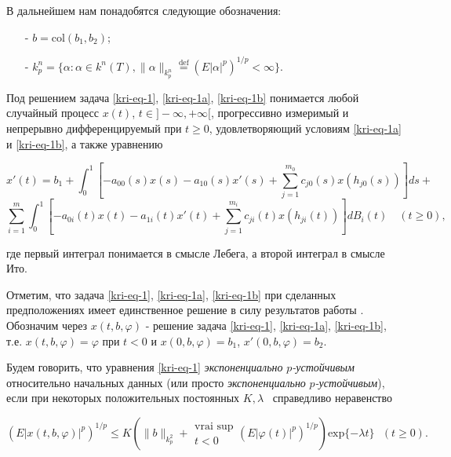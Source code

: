 В дальнейшем нам понадобятся следующие обозначения:

\begin{itemize}
	\item[-]
	$b=\text{col}(b_1,b_2)$;
	
	\item[-]
	$k_p^n=\{\alpha :\alpha \in k^n(T),\|\alpha \|_{k_p^n}\overset{\text{def}}{=}\left(E|\alpha
	|^p\right)^{1/p}<\infty \}$.
\end{itemize}

Под решением задача \eqref{kri-eq-1}, \eqref{kri-eq-1a}, \eqref{kri-eq-1b} понимается любой случайный процесс $x(t)$, $t\in ]-\infty ,+\infty[$, прогрессивно измеримый и непрерывно дифференцируемый при  $t\ge 0$, удовлетворяющий условиям \eqref{kri-eq-1a} и \eqref{kri-eq-1b}, а также уравнению

\begin{equation}\label{kri-eq-1-1}
	x'(t) = b_1+ \int_{0}^{1} \left[-a_{00}(s)x(s) - a_{10}(s)x'(s) + \sum_{j=1}^{m_0}c_{j0}(s)x(h_{j0}(s))\right]ds +
\end{equation}
\begin{equation*}
	\sum_{i=1}^{m} \int_{0}^{1} \left[-a_{0i}(t)x(t)-a_{1i}(t)x'(t)+\sum_{j=1}^{m_i}c_{ji}(t)x(h_{ji}(t))\right]dB_i(t) \quad (t \ge 0),
\end{equation*}

где первый интеграл понимается в смысле Лебега, а второй интеграл в смысле Ито.

Отметим, что задача \eqref{kri-eq-1}, \eqref{kri-eq-1a}, \eqref{kri-eq-1b} при сделанных предположениях имеет единственное решение в силу результатов работы \cite{kri-bib-10}. Обозначим через $x(t,b,\varphi )$ - решение задача \eqref{kri-eq-1}, \eqref{kri-eq-1a}, \eqref{kri-eq-1b}, т.е. $x(t,b,\varphi)=\varphi$ при $t<0$ и $x(0,b,\varphi)=b_1$, $x'(0,b,\varphi)=b_2$.

\begin{definition}
Будем говорить, что уравнения \eqref{kri-eq-1} \textit{экспоненциально } $p$\textit{{}-устойчивым}
относительно начальных данных (или просто \textit{экспоненциально } $p$\textit{{}-устойчивым}), если при некоторых
положительных постоянных  $K,\lambda $ \ справедливо неравенство

\begin{equation*}
(E|x(t,b,\varphi )|^p)^{1/p}\le K\left(\|b\|_{k_p^2}+\begin{matrix}\text{vrai sup}\\t<0\end{matrix}(E|\varphi
(t)|^p)^{1/p}\right)\text{exp}\{-\mathit{\lambda t}\}\text{  }(t\ge 0).
\end{equation*}
\end{definition}

